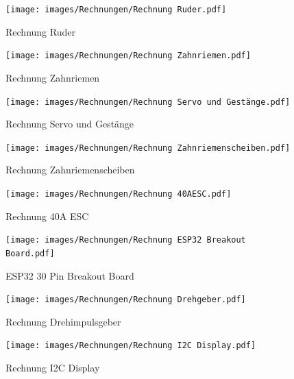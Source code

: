 \documentclass[a4paper,12pt]{article}
\begin{document}
\begin{figure}[H]
    \centering
    \begin{minipage}[b]{0.42\linewidth}
        \centering
        \texttt{[image: images/Rechnungen/Rechnung Ruder.pdf]}
        \caption{Rechnung Ruder}
        \label{fig:Rechnung Ruder}
    \end{minipage}
    \hspace{2.5em}  
    \begin{minipage}[b]{0.42\linewidth}
        \centering
        \texttt{[image: images/Rechnungen/Rechnung Zahnriemen.pdf]}
        \caption{Rechnung Zahnriemen}
        \label{fig:Rechnung Zahnriemen}
    \end{minipage}
\end{figure}


\begin{figure}[H]
    \centering
    \begin{minipage}[b]{0.42\linewidth}
        \centering
        \texttt{[image: images/Rechnungen/Rechnung Servo und Gestänge.pdf]}
        \caption{Rechnung Servo und Gestänge}
        \label{fig:Rechnung Servo und Gestänge}
    \end{minipage}
    \hspace{2.5em}  
    \begin{minipage}[b]{0.42\linewidth}
        \centering
        \texttt{[image: images/Rechnungen/Rechnung Zahnriemenscheiben.pdf]}
        \caption{Rechnung Zahnriemenscheiben}
        \label{fig:Rechnung Zahnriemenscheiben}
    \end{minipage}
\end{figure}

\begin{figure}[H]
    \centering
    \begin{minipage}[b]{0.42\linewidth}
        \centering
        \texttt{[image: images/Rechnungen/Rechnung 40AESC.pdf]}
        \caption{Rechnung 40A ESC}
        \label{fig:Rechnung 40A ESC}
    \end{minipage}
    \hspace{2.5em}  
    \begin{minipage}[b]{0.42\linewidth}
        \centering
        \texttt{[image: images/Rechnungen/Rechnung ESP32 Breakout Board.pdf]}
        \caption{ESP32 30 Pin Breakout Board}
        \label{fig:Rechnung Breakout Board}
    \end{minipage}
\end{figure}

\begin{figure}[H]
    \centering
    \begin{minipage}[b]{0.42\linewidth}
        \centering
        \texttt{[image: images/Rechnungen/Rechnung Drehgeber.pdf]}
        \caption{Rechnung Drehimpulsgeber}
        \label{fig:Rechnung Drehimpulsgeber}
    \end{minipage}
    \hspace{2.5em}  
    \begin{minipage}[b]{0.42\linewidth}
        \centering
        \texttt{[image: images/Rechnungen/Rechnung I2C Display.pdf]}
        \caption{Rechnung I2C Display}
        \label{fig:Rechnung I2C Display}
    \end{minipage}
\end{figure}
\end{document}

